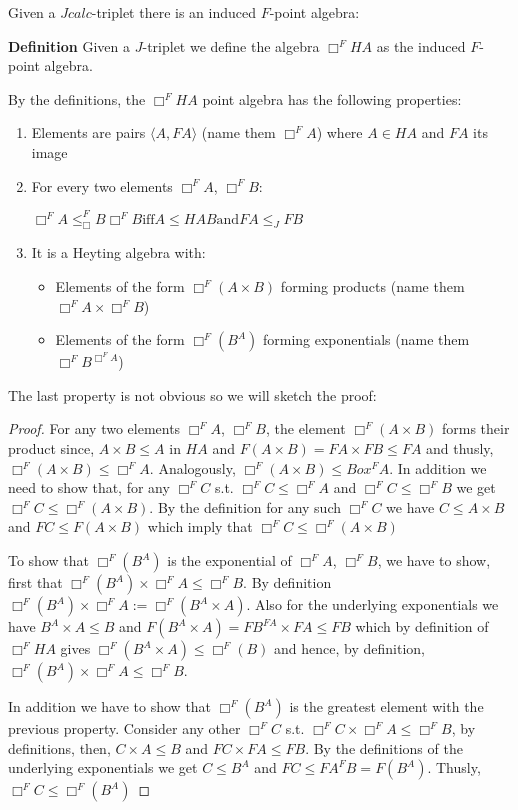 			Given a $Jcalc$-triplet there is an induced $F$-point algebra:
			\begin{mdframed}
				\textbf{Definition}
				Given a $J$-triplet we define the algebra  $\Box^{F}HA$ as the induced $F$-point algebra.
			\end{mdframed}
			By the definitions, the $\Box^{F}HA$ point algebra has the following properties:
			\begin{enumerate}
				\item Elements are pairs $\langle A, FA\rangle$ (name them $\Box^{F}A$) where $A\in HA$ and $FA$ its image
				\item For every two elements $\Box^{F}A$, $\Box^{F}B$:

				$\Box^{F}A \le_\Box^{F}B \Box^{F}B \text{iff} A\le{HA}B \text{and} FA\le_J FB $ 
				
				\item It is a Heyting algebra with:
				\begin{itemize}
					\item Elements of the form $\Box^F (A \times B)$ forming products 
					(name them $\Box^F A\times \Box^F B$)
					\item Elements of the form $\Box^F ( B^{A})$ 
					forming exponentials (name them $\Box^FB^{\Box^F{A}}$)
				\end{itemize}
			\end{enumerate}
			The last property is not obvious so we will sketch the proof:
			\begin{theorem}
			\end{theorem}
			\begin{proof}
				For any two elements $\Box^F A$, $\Box^F B$, the element $\Box^F (A \times B)$ forms their product since,
				$A \times B\le A$ in $HA$ and $F(A\times B)=FA\times FB \le FA$ and thusly, 
				$\Box^F (A \times B)\le \Box^FA$.
				Analogously, $\Box^F (A \times B)\le Box^FA$. 
				In addition we need to show that, for any $\Box^F C$ s.t. $\Box^F C\le \Box^F A $ and 
				$\Box^F C\le \Box^F B $ we get $\Box^F C\le\Box^F(A\times B)$. 
				By the definition for any such  $\Box^F C$ we have $C\le A\times B$
				and $FC\le F(A\times B)$ which imply that $\Box^F C\le\Box^F(A\times B)$

				To show that  $\Box^F ( B^{A})$ is the  exponential of $\Box^FA$, $\Box^FB$, 
				we have to show, first that $\Box^F ( B^{A})\times\Box^F A\le \Box^F B$.
				By definition $\Box^F ( B^{A})\times\Box^F A :=\Box^F( B^{A}\times A)$. Also
				for the underlying exponentials we have $ B^{A}\times A\le B$ and 
				$F(B^{A}\times A)= FB^{FA}\times FA \le FB$ which by definition of $\Box^F HA$
				gives   $\Box^F(B^{A}\times A)\le \Box^F(B)$ and hence, by definition, $\Box^F ( B^{A})\times \Box^F A\le \Box^F B$.

				In addition we have to show that $\Box^F ( B^{A})$ is the greatest element with the previous property.
				Consider any other $\Box^F C$ s.t. $\Box^F C\times\Box^F A\le \Box^F B$, by definitions, then, $C\times A\le B$
				 and $FC\times FA\le FB$. By the definitions of the underlying exponentials we get $C\le B^A$ and 
				 $FC \le FA^FB =F(B^A)$. Thusly, $\Box^F C\le \Box^F(B^A)$  
			\end{proof}


